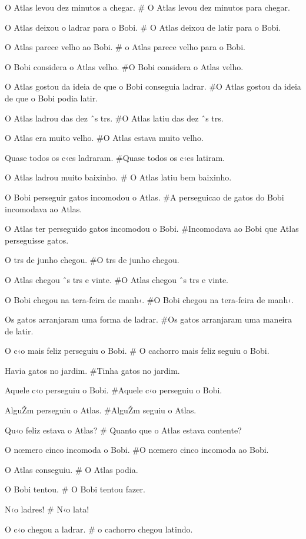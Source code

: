 O Atlas levou dez minutos a chegar.
# O Atlas levou dez minutos para chegar.

O Atlas deixou o ladrar para o Bobi.
# O Atlas deixou de latir para o Bobi.

O Atlas parece velho ao Bobi.
# o Atlas parece velho para o Bobi.

O Bobi considera o Atlas velho.
#O Bobi considera o Atlas velho.

O Atlas gostou da ideia de que o Bobi conseguia ladrar.
#O Atlas gostou da ideia de que o Bobi podia latir.

O Atlas ladrou das dez ˆs trs.
#O Atlas latiu das dez ˆs trs.

O Atlas era muito velho.
#O Atlas estava muito velho.

Quase todos os c‹es ladraram.
#Quase todos os c‹es latiram.

O Atlas ladrou muito baixinho.
# O Atlas latiu bem baixinho.

O Bobi perseguir gatos incomodou o Atlas.
#A perseguicao de gatos do Bobi incomodava ao Atlas.

O Atlas ter perseguido gatos incomodou o Bobi.
#Incomodava ao Bobi que Atlas perseguisse gatos.

O trs de junho chegou.
#O trs de junho chegou.

O Atlas chegou ˆs trs e vinte.
#O Atlas chegou ˆs trs e vinte.

O Bobi chegou na tera-feira de manh‹.
#O Bobi chegou na tera-feira de manh‹.

Os gatos arranjaram uma forma de ladrar.
#Os gatos arranjaram uma maneira de latir.

O c‹o mais feliz perseguiu o Bobi.
# O cachorro mais feliz seguiu o Bobi.

Havia gatos no jardim.
#Tinha gatos no jardim.

Aquele c‹o perseguiu o Bobi.
#Aquele c‹o perseguiu o Bobi.

AlguŽm perseguiu o Atlas.
#AlguŽm seguiu o Atlas.

Qu‹o feliz estava o Atlas?
# Quanto que o Atlas estava contente?

O nœmero cinco incomoda o Bobi.
#O nœmero cinco incomoda ao Bobi.

O Atlas conseguiu.
# O Atlas podia.

O Bobi tentou.
# O Bobi tentou fazer.

N‹o ladres!
# N‹o lata!

O c‹o chegou a ladrar.
# o cachorro chegou latindo.
